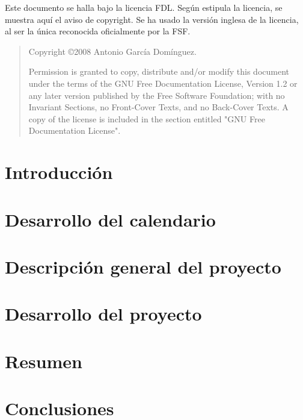 \documentclass[a4paper,12pt,titlepage,halfparskip,cleardoubleempty]{scrbook}
\begin{document}
\bigskip
\bigskip
\bigskip
\bigskip

Este documento se halla bajo la licencia \ac{FDL}. Según estipula la
licencia, se muestra aquí el aviso de copyright. Se ha usado la
versión inglesa de la licencia, al ser la única reconocida
oficialmente por la \ac{FSF}.

\begin{quote}
  Copyright \copyright  2008  Antonio García Domínguez.
  
  Permission is granted to copy, distribute and/or modify this document
  under the terms of the GNU Free Documentation License, Version 1.2
  or any later version published by the Free Software Foundation;
  with no Invariant Sections, no Front-Cover Texts, and no Back-Cover Texts.
  A copy of the license is included in the section entitled "GNU
  Free Documentation License".
\end{quote}

\clearpage

\tableofcontents
\listoffigures
\listoftables

\chapter{Introducción}


\chapter{Desarrollo del calendario}

 
\chapter{Descripción general del proyecto}

 
\chapter{Desarrollo del proyecto}


\chapter{Resumen}

 
\chapter{Conclusiones}

\end{document}
